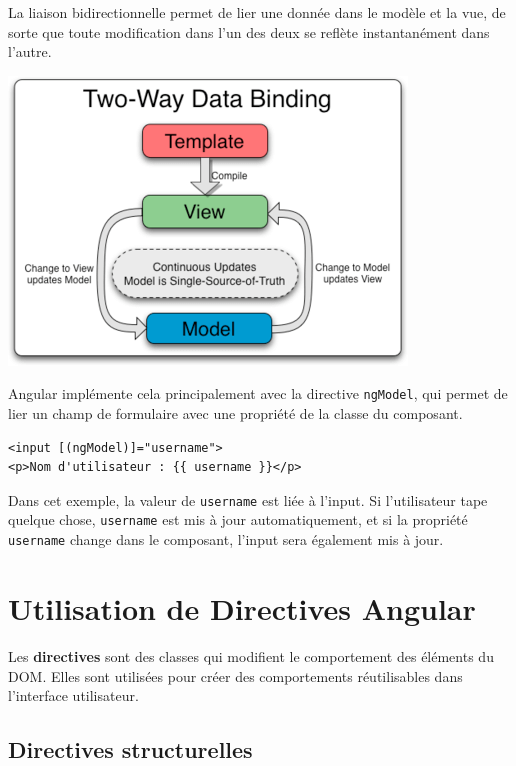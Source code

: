 \documentclass{article}
\begin{document}
La liaison bidirectionnelle permet de lier une donnée dans le modèle et la vue, de sorte que toute modification dans l’un des deux se reflète instantanément dans l’autre.
\begin{tcolorbox}[colframe=black!70, colback=white, title=Figure 6: Liaison bidirectionnelle, fonttitle=\bfseries]
\centering
\includegraphics[width=\textwidth]{images/angularjs-two-way-data-binding.png}
\end{tcolorbox}
Angular implémente cela principalement avec la directive \texttt{ngModel}, qui permet de lier un champ de formulaire avec une propriété de la classe du composant.

\begin{verbatim}
<input [(ngModel)]="username">
<p>Nom d'utilisateur : {{ username }}</p>
\end{verbatim}

Dans cet exemple, la valeur de \texttt{username} est liée à l'input. Si l'utilisateur tape quelque chose, \texttt{username} est mis à jour automatiquement, et si la propriété \texttt{username} change dans le composant, l'input sera également mis à jour.

\section{Utilisation de Directives Angular}

Les \textbf{directives} sont des classes qui modifient le comportement des éléments du DOM. Elles sont utilisées pour créer des comportements réutilisables dans l'interface utilisateur.

\subsection{Directives structurelles}
\end{document}
